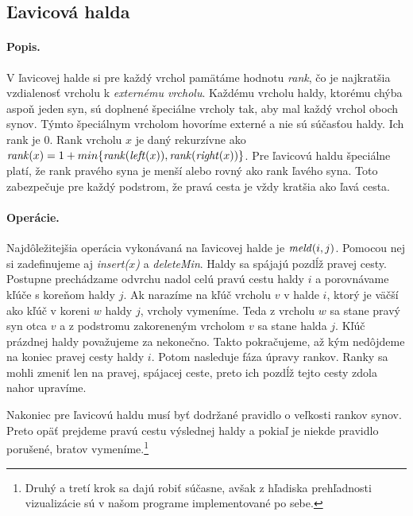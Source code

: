 \subsection{Ľavicová halda} 
\paragraph{Popis.}
V ľavicovej halde si pre každý vrchol pamätáme hodnotu \emph{rank}, čo je najkratšia 
vzdialenosť vrcholu k \emph{externému vrcholu}. Každému vrcholu haldy, ktorému chýba aspoň jeden syn, sú 
doplnené špeciálne vrcholy tak, aby mal každý vrchol oboch synov. Týmto špeciálnym vrcholom hovoríme externé 
a nie sú súčasťou haldy. Ich rank je $0$. Rank vrcholu $x$ je daný rekurzívne ako $\mathop{\mathit{rank}}(x) 
= 1 + min\{\mathop{\mathit{rank}}(\mathop{\mathit{left}}(x)), \mathop{\mathit{rank}}(\mathop{\mathit{right}}(x)) \}$. 
Pre ľavicovú haldu špeciálne platí, že rank pravého syna je menší alebo rovný ako rank ľavého syna.
Toto zabezpečuje pre každý podstrom, že pravá cesta je vždy kratšia ako ľavá cesta.

\paragraph{Operácie.}
Najdôležitejšia operácia vykonávaná na ľavicovej halde je $\mathop{\mathit{meld}}(i,j)$. Pomocou nej si zadefinujeme aj \emph{insert($x$)} a 
\emph{deleteMin}. Haldy sa spájajú pozdĺž pravej cesty. Postupne prechádzame odvrchu nadol celú pravú cestu haldy $i$ a 
porovnávame kľúče s koreňom haldy $j$. Ak narazíme na kľúč vrcholu $v$ v halde $i$, ktorý je väčší ako kľúč v koreni 
$w$ haldy $j$, vrcholy vymeníme. Teda z vrcholu $w$ sa stane pravý syn otca $v$ a z podstromu zakoreneným vrcholom $v$ sa stane halda $j$. Kľúč prázdnej 
haldy považujeme za nekonečno. Takto pokračujeme, až kým nedôjdeme na koniec pravej cesty haldy $i$.
Potom nasleduje fáza úpravy rankov. Ranky sa mohli zmeniť len na pravej, spájacej ceste, preto ich pozdĺž tejto cesty 
zdola nahor upravíme.

Nakoniec pre ľavicovú haldu musí byť dodržané pravidlo o veľkosti rankov synov. Preto opäť prejdeme pravú cestu 
výslednej haldy a pokiaľ je niekde pravidlo porušené, bratov vymeníme.\footnote{Druhý a tretí krok sa dajú robiť 
súčasne, avšak z hľadiska prehľadnosti vizualizácie sú v našom programe implementované po sebe.}

